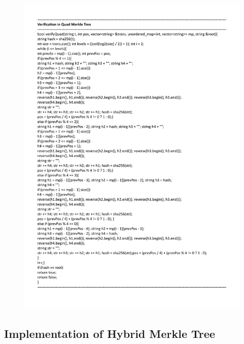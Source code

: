 \begin{figure}[H]
    \centering
    \includegraphics[scale=0.65]{figures/quad verify.pdf}
 
\end{figure}

\subsection{Implementation of Hybrid Merkle Tree}

 

